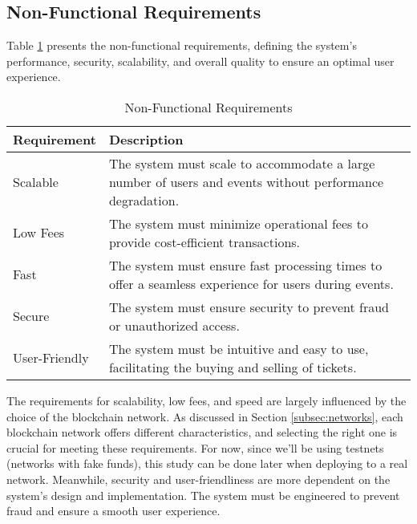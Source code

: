 \subsection{Non-Functional Requirements}
\label{subsec:non_functional_requirements}

Table \ref{tab:non_functional_requirements} presents the non-functional
requirements, defining the system's performance, security, scalability, and
overall quality to ensure an optimal user experience.

\begin{table}[H]
    \centering
    \begin{tabularx}{\textwidth}{lX}
        \hline
        \textbf{Requirement} & \textbf{Description}                                                                                     \\
        \hline
        Scalable             & The system must scale to accommodate a large number of users and events without performance degradation. \\
        \hline
        Low Fees             & The system must minimize operational fees to provide cost-efficient transactions.                        \\
        \hline
        Fast                 & The system must ensure fast processing times to offer a seamless experience for users during events.     \\
        \hline
        Secure               & The system must ensure security to prevent fraud or unauthorized access.                                 \\
        \hline
        User-Friendly        & The system must be intuitive and easy to use, facilitating the buying and selling of tickets.            \\
        \hline
    \end{tabularx}
    \caption{Non-Functional Requirements}
    \label{tab:non_functional_requirements}
\end{table}

The requirements for scalability, low fees, and speed are largely influenced by
the choice of the blockchain network. As discussed in Section
\ref{subsec:networks}, each blockchain network offers different
characteristics, and selecting the right one is crucial for meeting these
requirements. For now, since we'll be using testnets (networks with fake
funds), this study can be done later when deploying to a real network.
Meanwhile, security and user-friendliness are more dependent on the system's
design and implementation. The system must be engineered to prevent fraud and
ensure a smooth user experience.
